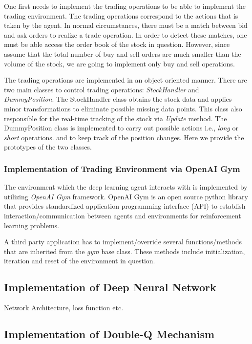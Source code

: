 \documentclass[twocolumn,aps,pra,superscriptaddress,nofootinbib,longbibliography]{revtex4-2}
\begin{document}
One first needs to implement the trading operations to be able to implement the trading environment. The trading operations correspond to the actions that is taken by the agent. In normal circumstances, there must be a match between bid and ask orders to realize a trade operation. In order to detect these matches, one must be able access the order book of the stock in question. However, since assume that the total number of buy and sell orders are much smaller than the volume of the stock, we are going to implement only buy and sell operations. 

The trading operations are implemented in an object oriented manner. There are two main classes to control trading operations: \textit{StockHandler} and \textit{DummyPosition}. The StockHandler class obtains the stock data and applies minor transformations to eliminate possible missing data points. This class also responsible for the real-time tracking of the stock via \textit{Update} method. The DummyPosition class is implemented to carry out possible actions i.e., \textit{long} or \textit{short} operations. and to keep track of the position changes. Here we provide the prototypes of the two classes. 


\subsubsection{Implementation of Trading Environment via OpenAI Gym}

The environment which the deep learning agent interacts with is implemented by utilizing \textit{OpenAI Gym} framework. OpenAI Gym is an open source python library that provides standardized application programming interface (API) to establish interaction/communication between agents and environments for reinforcement learning problems. 

A third party application has to implement/override several functions/methods that are inherited from the \textit{gym} base class. These methods include initialization, iteration and reset of the environment in question. 



\subsection{Implementation of Deep Neural Network}

Network Architecture, loss function etc.

\subsection{Implementation of Double-Q Mechanism}
\end{document}
